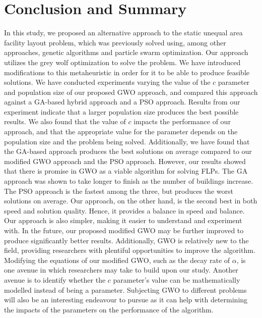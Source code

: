 \chapter{Conclusion and Summary}

In this study, we proposed an alternative approach to the static unequal area facility layout problem, which was previously solved using, among other approaches, genetic algorithms and particle swarm optimization. Our approach utilizes the grey wolf optimization to solve the problem. We have introduced modifications to this metaheuristic in order for it to be able to produce feasible solutions. We have conducted experiments varying the value of the $c$ parameter and population size of our proposed GWO approach, and compared this approach against a GA-based hybrid approach and a PSO approach. Results from our experiment indicate that a larger population size produces the best possible results. We also found that the value of $c$ impacts the performance of our approach, and that the appropriate value for the parameter depends on the population size and the problem being solved. Additionally, we have found that the GA-based approach produces the best solutions on average compared to our modified GWO approach and the PSO approach. However, our results showed that there is promise in GWO as a viable algorithm for solving FLPs. The GA approach was shown to take longer to finish as the number of buildings increase. The PSO approach is the fastest among the three, but produces the worst solutions on average. Our approach, on the other hand, is the second best in both speed and solution quality. Hence, it provides a balance in speed and balance. Our approach is also simpler, making it easier to understand and experiment with. In the future, our proposed modified GWO may be further improved to produce significantly better results. Additionally, GWO is relatively new to the field, providing researchers with plentiful opportunities to improve the algorithm. Modifying the equations of our modified GWO, such as the decay rate of $\alpha$, is one avenue in which researchers may take to build upon our study. Another avenue is to identify whether the $c$ parameter's value can be mathematically modelled instead of being a parameter. Subjecting GWO to different problems will also be an interesting endeavour to pursue as it can help with determining the impacts of the parameters on the performance of the algorithm.
